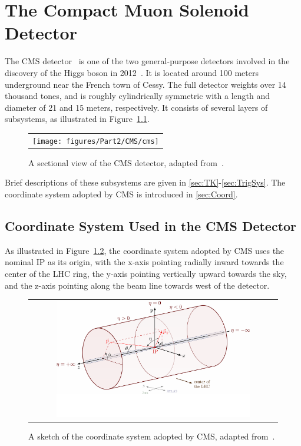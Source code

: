 \chapter{The Compact Muon Solenoid Detector}
\label{chap:CMS}

The \ac{CMS} detector~\cite{CMS:2008xjf} is one of the two general-purpose detectors involved in the discovery of the Higgs boson in 2012~\cite{ATLAS:2012yve,CMS:2012qbp}. It is located around 100 meters underground near the French town of Cessy. The full detector weights over 14 thousand tones, and is roughly cylindrically symmetric with a length and diameter of 21 and 15 meters, respectively. It consists of several layers of subsystems, as illustrated in Figure~\ref{fig:CMS}.

\begin{figure}[tbh!]
 \begin{center}
 \begin{tabular}{c}
 \texttt{[image: figures/Part2/CMS/cms]}
 \end{tabular}
 \caption{A sectional view of the \ac{CMS} detector, adapted from~\cite{Sakuma:2013jqa}.}
 \label{fig:CMS}
 \end{center}
\end{figure}

Brief descriptions of these subsystems are given in \autoref{sec:TK}-\autoref{sec:TrigSys}. The coordinate system adopted by \ac{CMS} is introduced in \autoref{sec:Coord}.

\section{Coordinate System Used in the CMS Detector}
\label{sec:Coord}

As illustrated in Figure~\ref{fig:axis3D}, the coordinate system adopted by \ac{CMS} uses the nominal \ac{IP} as its origin, with the x-axis pointing radially inward towards the center of the \ac{LHC} ring, the y-axis pointing vertically upward towards the sky, and the z-axis pointing along the beam line towards west of the detector.

\begin{figure}[tbh!]
 \begin{center}
 \begin{tabular}{c}
 \includegraphics[width=0.8\textwidth]{figures/Part2/CMS/axis3D_CMS-004}
 \end{tabular}
 \caption{A sketch of the coordinate system adopted by \ac{CMS}, adapted from~\cite{tikz:3D}.}
 \label{fig:axis3D}
 \end{center}
\end{figure}

